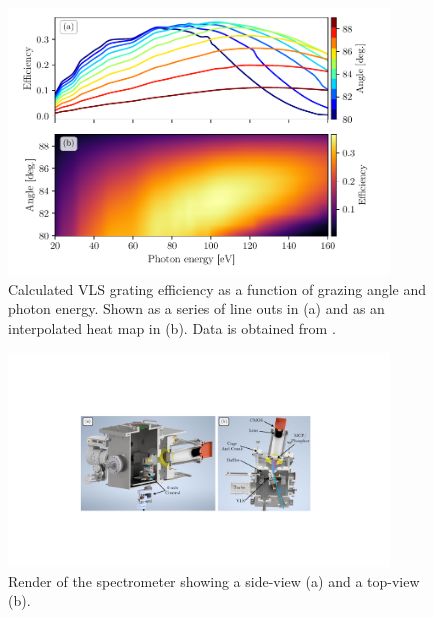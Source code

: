 \begin{figure}
	\centering
	\includegraphics[width=0.9\textwidth]{figures/Beamline/grating_efficiency.pdf}
	\caption[VLS grating efficiency as a function of incident angle and photon energy]{Calculated VLS grating efficiency as a function of grazing angle and photon energy.  Shown as a series of line outs in (a) and as an interpolated heat map in (b).  Data is obtained from \cite{hageDevelopmentXUVSpectrometer}.}
	\label{fig:grating_efficiency}
\end{figure}

\begin{figure}
	\centering
	\includegraphics[width=0.9\textwidth]{figures/Beamline/CAD_spectrometer.pdf}
	\caption[CAD render of the TABLe spectrometer]{Render of the spectrometer showing a side-view (a) and a top-view (b).}
	\label{fig:CAD_spectrometer}
\end{figure}

